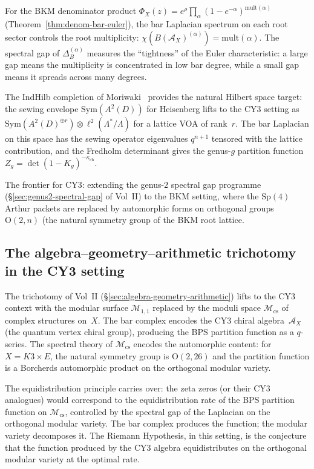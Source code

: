 \documentclass[11pt]{article}
\newcommand{\cA}{\mathcal{A}}
\newcommand{\cM}{\mathcal{M}}
\begin{document}
For the BKM denominator product
$\Phi_X(z) = e^\rho \prod_\alpha
(1 - e^{-\alpha})^{\mathrm{mult}(\alpha)}$
(Theorem~\ref{thm:denom-bar-euler}), the bar Laplacian
spectrum on each root sector controls the root multiplicity:
$\chi(B(\cA_X)^{(\alpha)}) = \mathrm{mult}(\alpha)$.
The spectral gap of $\Delta_B^{(\alpha)}$ measures the
``tightness'' of the Euler characteristic: a large gap
means the multiplicity is concentrated in low bar degree,
while a small gap means it spreads across many degrees.

The IndHilb completion of Moriwaki~\cite{Moriwaki26a}
provides the natural Hilbert space target: the sewing
envelope $\mathrm{Sym}(A^2(D))$ for Heisenberg lifts to
the CY3 setting as
$\mathrm{Sym}(A^2(D)^{\oplus r}) \otimes \ell^2(\Lambda^*/\Lambda)$
for a lattice VOA of rank~$r$. The bar Laplacian on this
space has the sewing operator eigenvalues $q^{n+1}$
tensored with the lattice contribution, and the Fredholm
determinant gives the genus-$g$ partition function
$Z_g = \det(1 - K_g)^{-\kappa_{\mathrm{ch}}}$.

The frontier for CY3: extending the genus-$2$ spectral gap
programme (\S\ref*{sec:genus2-spectral-gap} of Vol~II) to
the BKM setting, where the $\mathrm{Sp}(4)$ Arthur packets
are replaced by automorphic forms on orthogonal groups
$\mathrm{O}(2,n)$ (the natural symmetry group of the
BKM root lattice.

\subsection{The algebra--geometry--arithmetic trichotomy
 in the CY3 setting}

The trichotomy of Vol~II
(\S\ref*{sec:algebra-geometry-arithmetic})
lifts to the CY3 context with the modular surface
$\cM_{1,1}$ replaced by the moduli space $\cM_{\mathrm{cs}}$
of complex structures on~$X$. The bar complex encodes the
CY3 chiral algebra~$\cA_X$ (the quantum vertex chiral group),
producing the BPS partition function as a $q$-series. The
spectral theory of $\cM_{\mathrm{cs}}$ encodes the
automorphic content: for $X = K3 \times E$, the natural
symmetry group is $\mathrm{O}(2,26)$ and the partition
function is a Borcherds automorphic product on the
orthogonal modular variety.

The equidistribution principle carries over: the zeta zeros
(or their CY3 analogues) would correspond to the
equidistribution rate of the BPS partition function on
$\cM_{\mathrm{cs}}$, controlled by the spectral gap of the
Laplacian on the orthogonal modular variety. The bar complex
produces the function; the modular variety decomposes it.
The Riemann Hypothesis, in this setting, is the conjecture
that the function produced by the CY3 algebra equidistributes
on the orthogonal modular variety at the optimal rate.
\end{document}

